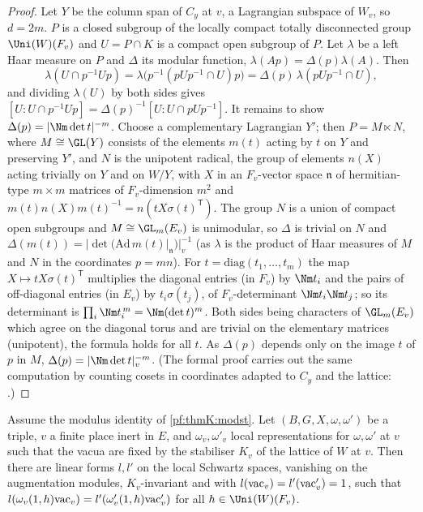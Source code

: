 \begin{proof}
Let $Y$ be the column span of $C_y$ at $v$, a Lagrangian subspace of $W_v$, so $d=2m$. $P$ is a closed subgroup of the
locally compact totally disconnected group $\Uni(W)(F_v)$ and $U=P\cap K$ is a compact open subgroup of $P$. Let $\lambda$
be a left Haar measure on $P$ and $\Delta$ its modular function, $\lambda(Ap)=\Delta(p)\lambda(A)$. Then
\[
\lambda(U\cap p^{-1}Up)=\lambda\bigl(p^{-1}(pUp^{-1}\cap U)p\bigr)=\Delta(p)\,\lambda(pUp^{-1}\cap U),
\]
and dividing $\lambda(U)$ by both sides gives $[U:U\cap p^{-1}Up]=\Delta(p)^{-1}[U:U\cap pUp^{-1}]$. It remains to show
$\Delta(p)=|\Nm\det t|^{-m}$. Choose a complementary Lagrangian $Y'$; then $P=M\ltimes N$, where $M\cong\GL(Y)$ consists of
the elements $m(t)$ acting by $t$ on $Y$ and preserving $Y'$, and $N$ is the unipotent radical, the group of elements
$n(X)$ acting trivially on $Y$ and on $W/Y$, with $X$ in an $F_v$-vector space $\mathfrak n$ of hermitian-type $m\times m$
matrices of $F_v$-dimension $m^2$ and $m(t)n(X)m(t)^{-1}=n(tX\sigma(t)^{\mathsf T})$. The group $N$ is a union of compact open
subgroups and $M\cong\GL_m(E_v)$ is unimodular, so $\Delta$ is trivial on $N$ and $\Delta(m(t))=|\det(\mathrm{Ad}\,m(t)|
_{\mathfrak n})|_v^{-1}$ (as $\lambda$ is the product of Haar measures of $M$ and $N$ in the coordinates $p=mn$). For
$t=\mathrm{diag}(t_1,\dots,t_m)$ the map $X\mapsto tX\sigma(t)^{\mathsf T}$ multiplies the diagonal entries (in $F_v$) by
$\Nm t_i$ and the pairs of off-diagonal entries (in $E_v$) by $t_i\sigma(t_j)$, of $F_v$-determinant $\Nm t_i\Nm t_j$;
so its determinant is $\prod_i\Nm t_i^{\,m}=\Nm(\det t)^m$. Both sides being characters of $\GL_m(E_v)$ which agree on the
diagonal torus and are trivial on the elementary matrices (unipotent), the formula holds for all $t$. As $\Delta(p)$
depends only on the image $t$ of $p$ in $M$, $\Delta(p)=|\Nm\det t|_v^{-m}$. (The formal proof carries out the same
computation by counting cosets in coordinates adapted to $C_y$ and the lattice:
.)
\end{proof}

\begin{proposition}\label{pf:thmK:sphfun}
Assume the modulus identity of \cref{pf:thmK:modst}. Let $(B,G,X,\omega,\omega')$ be a triple, $v$ a finite place inert in
$E$, and $\omega_v,\omega'_v$ local representations for $\omega,\omega'$ at $v$ such that the vacua are fixed by the
stabiliser $K_v$ of the lattice of $W$ at $v$. Then there are linear forms $l,l'$ on the local Schwartz spaces, vanishing
on the augmentation modules, $K_v$-invariant and with $l(\mathrm{vac}_v)=l'(\mathrm{vac}'_v)=1$, such that
$l(\omega_v(1,h)\mathrm{vac}_v)=l'(\omega'_v(1,h)\mathrm{vac}'_v)$ for all $h\in\Uni(W)(F_v)$.
\end{proposition}

